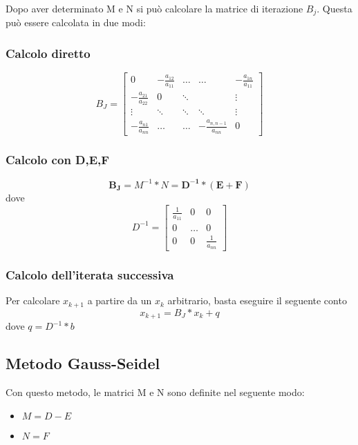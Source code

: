 Dopo aver determinato M e N si può calcolare la matrice di iterazione $B_j$. Questa può essere calcolata in due modi:
\subsubsection{Calcolo diretto}
$$B_J =
\begin{bmatrix}
0 & -\frac{a_{12}}{a_{11}} & \dots & \dots & -\frac{a_{1n}}{a_{11}} \\
-\frac{a_{21}}{a_{22}} & 0 &  \ddots & & \vdots \\
\vdots & \ddots & \ddots & \ddots & \vdots \\
-\frac{a_{n1}}{a_{nn}} & \dots & \dots & -\frac{a_{n,n-1}}{a_{nn}} & 0
\end{bmatrix}
$$

\subsubsection{Calcolo con D,E,F}
\label{Calcolo con D,E,F}
$$ \boldsymbol{B_J} = M^{-1}*N = \boldsymbol{D^{-1}*(E+F)} $$
dove  $$D^{-1} = 
\begin{bmatrix}
\frac{1}{a_{11}} & 0 & 0 \\
0 & \dots &  0\\
0 & 0 & \frac{1}{a_{nn}}
\end{bmatrix}
$$

\subsubsection{Calcolo dell'iterata successiva}
\label{Calcolo dell'iterata successiva}
Per calcolare $x_{k+1}$ a partire da un $x_k$ arbitrario, basta eseguire il seguente conto $$x_{k+1} = B_J * x_k + q$$
dove $q = D^{-1}*b$

\subsection{Metodo Gauss-Seidel}
\label{Metodo Gauss-Seidel}
Con questo metodo, le matrici M e N sono definite nel seguente modo:
\begin{itemize}
\item $M = D - E$
\item $N = F$
\end{itemize}

